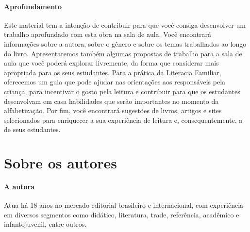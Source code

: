 \documentclass[11pt]{extarticle}
\begin{document}
\paragraph{Aprofundamento} Este material tem a 
intenção de contribuir para que você consiga desenvolver um trabalho aprofundado 
com esta obra na sala de aula. Você encontrará informações sobre a autora, sobre 
o gênero e sobre os temas trabalhados ao longo do livro. Apresentaremos também 
algumas propostas de trabalho para a sala de aula que você poderá explorar livremente, 
da forma que considerar mais apropriada para os seus estudantes. Para a prática 
da Literacia Familiar, oferecemos um guia que pode ajudar nas orientações aos 
responsáveis pela criança, para incentivar o gosto pela leitura e contribuir para 
que os estudantes desenvolvam em casa habilidades que serão importantes no momento 
da alfabetização. Por fim, você encontrará sugestões de livros, artigos e sites 
selecionados para enriquecer a sua experiência de leitura e, 
consequentemente, a de seus estudantes.



\section{Sobre os autores}

\paragraph{A autora}
Atua há 18 anos no 
mercado editorial brasileiro e internacional, com experiência 
em diversos segmentos como didático, literatura, trade, 
referência, acadêmico e infantojuvenil, entre outros. 
\end{document}
